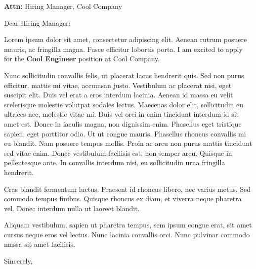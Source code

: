 \documentclass{letter}
\newcommand{\sendername}{John Doe}
\newcommand{\attn}{Hiring Manager}
\newcommand{\addressedto}{Hiring Manager}
\newcommand{\company}{Cool Company}
\newcommand{\position}{Cool Engineer}
\begin{document}
    \begin{letter}{\textbf{Attn:} \attn, \company}
    
        \opening{Dear \addressedto:}
        
        
        Lorem ipsum dolor sit amet, consectetur adipiscing elit. Aenean rutrum posuere mauris, ac fringilla magna. Fusce efficitur lobortis porta. I am excited to apply for the \textbf{\position} position at \company.
        
        Nunc sollicitudin convallis felis, ut placerat lacus hendrerit quis. Sed non purus efficitur, mattis mi vitae, accumsan justo. Vestibulum ac placerat nisi, eget suscipit elit. Duis vel erat a eros interdum lacinia. Aenean id massa eu velit scelerisque molestie volutpat sodales lectus. Maecenas dolor elit, sollicitudin eu ultrices nec, molestie vitae mi. Duis vel orci in enim tincidunt interdum id sit amet est. Donec in iaculis magna, non dignissim enim. Phasellus eget tristique sapien, eget porttitor odio. Ut ut congue mauris. Phasellus rhoncus convallis mi eu blandit. Nam posuere tempus mollis. Proin ac arcu non purus mattis tincidunt sed vitae enim. Donec vestibulum facilisis est, non semper arcu. Quisque in pellentesque ante. In convallis interdum nisi, eu sollicitudin urna fringilla hendrerit.
        
        Cras blandit fermentum luctus. Praesent id rhoncus libero, nec varius metus. Sed commodo tempus finibus. Quisque rhoncus ex diam, et viverra neque pharetra vel. Donec interdum nulla ut laoreet blandit. 
        
        Aliquam vestibulum, sapien ut pharetra tempus, sem ipsum congue erat, sit amet cursus neque eros vel lectus. Nunc lacinia convallis orci. Nunc pulvinar commodo massa sit amet facilisis.
        
        \closing{Sincerely,\\
                  \vspace{-2pt} \\
                 \fromname{\sendername}}
        
        \vspace{-50pt}
    
    \end{letter}
\end{document}

